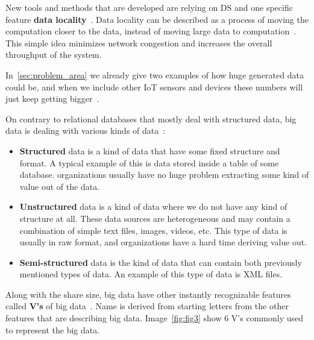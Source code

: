 New tools and methods that are developed are relying on DS and one specific feature \textbf{data locality}~\label{ds:data_locality}. Data locality can be described as a process of moving the computation closer to the data, instead of moving large data to computation~\cite{GuoFZ12}. This simple idea minimizes network congestion and increases the overall throughput of the system.

In~\ref{sec:problem_area} we already give two examples of how huge generated data could be, and when we include other IoT sensors and devices these numbers will just keep getting bigger~\cite{SarigiannidisLR20}.

On contrary to relational databases that mostly deal with structured data, big data is dealing with various kinds of data~\cite{FisherDCD12, Tsai2015, GuoFZ12}:

\begin{itemize}
	\item \textbf{Structured} data is a kind of data that have some fixed structure and format. A typical example of this is data stored inside a table of some database. organizations usually have no huge problem extracting some kind of value out of the data.
	\item \textbf{Unstructured} data is a kind of data where we do not have any kind of structure at all. These data sources are heterogeneous and may contain a combination of simple text files, images, videos, etc. This type of data is usually in raw format, and organizations have a hard time deriving value out.
	\item \textbf{Semi-structured} data is the kind of data that can contain both previously mentioned types of data. An example of this type of data is XML files.
\end{itemize}

\noindent
Along with the share size, big data have other instantly recognizable features called \textbf{V's} of big data~\cite{PatgiriA16}. Name is derived from starting letters from the other features that are describing big data. Image~\ref{fig:fig3} show 6 V's commonly used to represent the big data.

